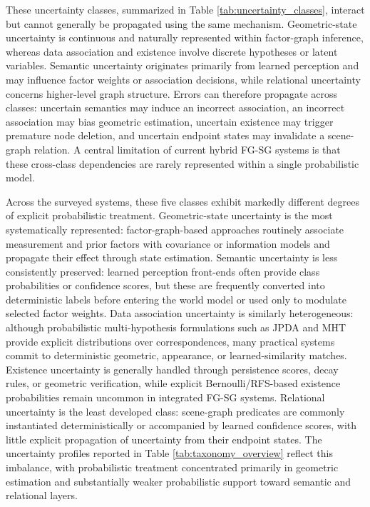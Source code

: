 These uncertainty classes, summarized in Table \ref{tab:uncertainty_classes}, interact but cannot generally be propagated using the same mechanism. 
Geometric-state uncertainty is continuous and naturally represented within factor-graph inference, whereas data association and existence involve discrete hypotheses or latent variables. 
Semantic uncertainty originates primarily from learned perception and may influence factor weights or association decisions, while relational uncertainty concerns higher-level graph structure.
Errors can therefore propagate across classes: uncertain semantics may induce an incorrect association, an incorrect association may bias geometric estimation, uncertain existence may trigger premature node deletion, and uncertain endpoint states may invalidate a scene-graph relation. 
A central limitation of current hybrid FG-SG systems is that these cross-class dependencies are rarely represented within a single probabilistic model.

Across the surveyed systems, these five classes exhibit markedly different degrees of explicit probabilistic treatment. Geometric-state uncertainty is the most systematically represented: factor-graph-based approaches routinely associate measurement and prior factors with covariance or information models and propagate their effect through state estimation.
Semantic uncertainty is less consistently preserved: learned perception front-ends often provide class probabilities or confidence scores, but these are frequently converted into deterministic labels before entering the world model or used only to modulate selected factor weights.
Data association uncertainty is similarly heterogeneous: although probabilistic multi-hypothesis formulations such as JPDA and MHT provide explicit distributions over correspondences, many practical systems commit to deterministic geometric, appearance, or learned-similarity matches. 
Existence uncertainty is generally handled through persistence scores, decay rules, or geometric verification, while explicit Bernoulli/RFS-based existence probabilities remain uncommon in integrated FG-SG systems. 
Relational uncertainty is the least developed class: scene-graph predicates are commonly instantiated deterministically or accompanied by learned confidence scores, with little explicit propagation of uncertainty from their endpoint states.
The uncertainty profiles reported in Table \ref{tab:taxonomy_overview} reflect this imbalance, with probabilistic treatment concentrated primarily in geometric estimation and substantially weaker probabilistic support toward semantic and relational layers.

